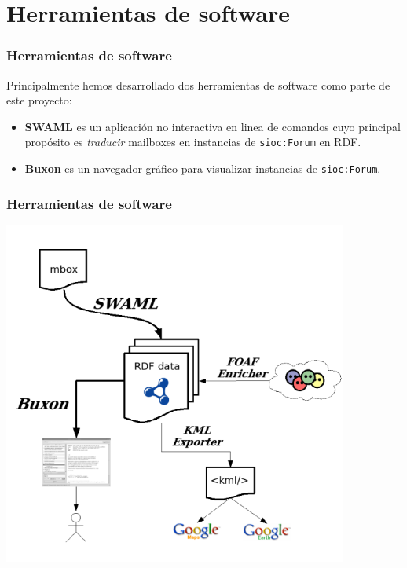 \documentclass[spanish,notes=hide]{beamer}
\begin{document}
\section{Herramientas de software}
\frame
{
  \frametitle{Herramientas de software}

  Principalmente hemos desarrollado dos herramientas de software como parte
  de este proyecto:
  \vspace{0.5cm}
  \begin{itemize}
    \item<2->	\begin{Large}\textbf{SWAML} es un aplicación no interactiva
		en linea de comandos cuyo principal propósito es \textit{traducir}
		mailboxes en instancias de \texttt{sioc:Forum} en RDF.\end{Large}
    \vspace{1cm}
    \item<3->	\begin{Large}\textbf{Buxon} es un navegador gráfico para
		visualizar instancias de \texttt{sioc:Forum}.\end{Large}
  \end{itemize}
}
\frame
{
  \frametitle{Herramientas de software}

  \begin{center}
    \includegraphics[width=0.85\textwidth]{images/swaml-tools.png}
  \end{center}
}
\frame
\end{document}
